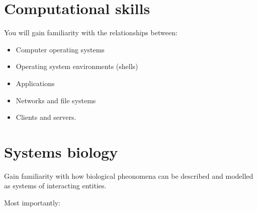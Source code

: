 \documentclass{scrartcl}
\begin{document}
\section{Computational skills}
\label{sec-5}

You will gain familiarity with the relationships between:
\begin{itemize}
\item Computer operating systems
\item Operating system environments (shells)
\item Applications
\item Networks and file systems
\item Clients and servers.
\end{itemize}
\section{Systems biology}
\label{sec-6}

Gain familiarity with how biological pheonomena can be described and modelled
as systems of interacting entities.

\vspace{1.5cm}
Most importantly:
\par{}\par\smallskip
\end{document}
